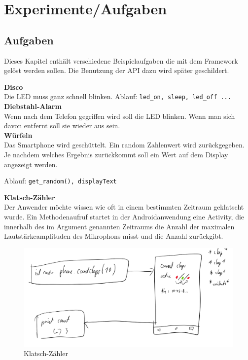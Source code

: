\documentclass[11pt,a4paper]{report}
\begin{document}
\chapter{Experimente/Aufgaben} \label{chap:Experimente}

\section*{Aufgaben}
Dieses Kapitel enthält verschiedene Beispielaufgaben die mit dem Framework gelöst werden sollen.
Die Benutzung der API dazu wird später geschildert.


\textbf{Disco}\\
Die LED muss ganz schnell blinken.
Ablauf: \verb|led_on, sleep, led_off ...|
\\

\textbf{Diebstahl-Alarm}\\
Wenn nach dem Telefon gegriffen wird soll die LED blinken.
Wenn man sich davon entfernt soll sie wieder aus sein.
\\

\textbf{Würfeln}\\
Das Smartphone wird geschüttelt.
Ein random Zahlenwert wird zurückgegeben.
Je nachdem welches Ergebnis zurückkommt soll ein Wert auf dem Display angezeigt werden.

Ablauf: \verb|get_random(), displayText|

\textbf{Klatsch-Zähler}\\
Der Anwender möchte wissen wie oft in einem bestimmten Zeitraum geklatscht wurde.
Ein Methodenaufruf startet in der Androidanwendung eine Activity, die innerhalb des im Argument genannten Zeitraums die Anzahl der maximalen Lautstärkeamplituden des Mikrophons misst und die Anzahl zurückgibt.
\begin{figure}[htbp]
  \centering
  \includegraphics[width=.9\textwidth]{images/count_claps.png}
  \caption{Klatsch-Zähler}
  \label{fig:clap_count}
\end{figure}
\end{document}
